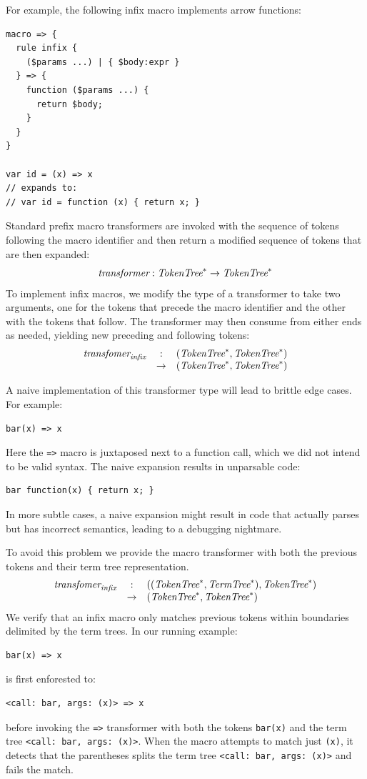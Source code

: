 \documentclass[preprint,10pt]{sigplanconf}
\begin{document}
For example, the following infix macro implements arrow functions:
\begin{lstlisting}
macro => {
  rule infix {
    ($params ...) | { $body:expr }
  } => {
    function ($params ...) {
      return $body; 
    }
  }
}

var id = (x) => x
// expands to:
// var id = function (x) { return x; }
\end{lstlisting}


Standard prefix macro transformers are invoked with the sequence of
tokens following the macro identifier and then return a modified
sequence of tokens that are then expanded:
\[
\textit{transformer} : \textit{TokenTree}^* \rightarrow \textit{TokenTree}^*
\]
To implement infix macros, we modify the type of a transformer to
take two arguments, one for the tokens that precede the macro
identifier and the other with the tokens that follow. The transformer
may then consume from either ends as needed, yielding new preceding
and following tokens:
\[
\begin{array}{rcl}
  \textit{transfomer}_{\textit{infix}} &:& (\textit{TokenTree}^*, \textit{TokenTree}^*) 
  \\
  &\rightarrow& (\textit{TokenTree}^*, \textit{TokenTree}^*)
\end{array}
\]

A naive implementation of this transformer type will lead to brittle
edge cases. For example:
\begin{lstlisting}
bar(x) => x
\end{lstlisting}
Here the \verb!=>! macro is juxtaposed next to a function call,
which we did not intend to be valid syntax. The naive expansion results
in unparsable code:
\begin{lstlisting}
bar function(x) { return x; }
\end{lstlisting}

In more subtle cases, a naive expansion might result in code that
actually parses but has incorrect semantics, leading to a
debugging nightmare.

To avoid this problem we provide the macro transformer with both the
previous tokens and their term tree representation.
\[
\begin{array}{rcl}
  \textit{transfomer}_{\textit{infix}} &:& ((\textit{TokenTree}^*, \textit{TermTree}^{*}), \textit{TokenTree}^*) 
  \\
  &\rightarrow& (\textit{TokenTree}^*, \textit{TokenTree}^*)
\end{array}
\]
We verify that an infix macro only
matches previous tokens within boundaries delimited by 
the term trees. In our running example:
\begin{lstlisting}
bar(x) => x
\end{lstlisting}
is first enforested to:
\begin{lstlisting}
<call: bar, args: (x)> => x
\end{lstlisting}
before invoking the \verb!=>! transformer with both the tokens
\verb!bar(x)! and the term tree
\verb!<call: bar, args: (x)>!. When the macro attempts to match
just \verb!(x)!, it detects that the parentheses splits the term
tree \verb!<call: bar, args: (x)>! and fails the match.
\end{document}
